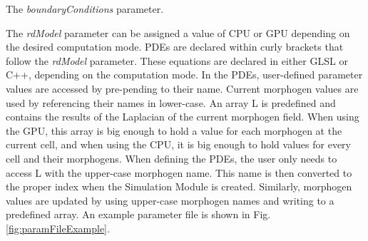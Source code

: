 The \textit{boundaryConditions} parameter. %

The \textit{rdModel} parameter can be assigned a value of CPU or GPU depending on the desired computation mode. PDEs are declared within curly brackets that follow the \textit{rdModel} parameter. These equations are declared in either GLSL or C++, depending on the computation mode. In the PDEs, user-defined parameter values are accessed by pre-pending  to their name. Current morphogen values are used by referencing their names in lower-case. An array L is predefined and contains the results of the Laplacian of the current morphogen field. When using the GPU, this array is big enough to hold a value for each morphogen at the current cell, and when using the CPU, it is big enough to hold values for every cell and their morphogens. When defining the PDEs, the user only needs to access L with the upper-case morphogen name. This name is then converted to the proper index when the Simulation Module is created. Similarly, morphogen values are updated by using upper-case morphogen names and writing to a predefined  array. An example parameter file is shown in Fig. \ref{fig:paramFileExample}.


